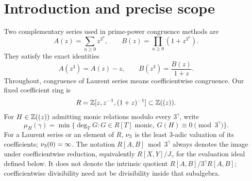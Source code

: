 \maketitle
\begin{abstract}
Let $A(z)=\sum_{n\ge0}z^{3^n}$ and
$B(z)=\prod_{n\ge0}(1+z^{3^n})$. We study their joint algebra modulo
powers of $3$ over $R=\Z[z,z^{-1},(1+z)^{-1}]$.
The individual minimum-degree problems of Krattenthaler and M\"uller
provide a starting point, but do not determine mixed relations.
We give exact joint evaluation kernels modulo $3,9,27,81$, with
respectively $6,18,36,48$ necessary and sufficient module generators.
For $H=A+B$, the minimum degree of a monic annihilator is exactly
$6\gamma$ for $1\le\gamma\le9$, and exactly $54$ for $\gamma=10$.
The lower bounds use two independent Artin--Schreier correction classes.
For every polynomial $F(A,B)$, a root-counting norm construction gives
an annihilator of degree at most $6d$, where
$d+\sum_{j\ge1}\lfloor d/9^j\rfloor\ge\gamma$.
This is $(16/3)\gamma+O(\log\gamma)$, improving the elementary $6\gamma$
bound. We also give an all-precision mixed spanning theorem, classify
the reduced mixed fields for every odd prime, and supply a direct
characteristic-zero independence proof. The full mixed kernel and the
optimal degree for $H$ beyond precision $3^{10}$ are left open.
\end{abstract}

\section{Introduction and precise scope}
\label{sec:intro}

Two complementary series used in prime-power congruence methods are
\begin{equation}\label{eq:AB}
 A(z)=\sum_{n\ge0}z^{3^n},\qquad
 B(z)=\prod_{n\ge0}(1+z^{3^n}).
\end{equation}
They satisfy the exact identities
\begin{equation}\label{eq:functional}
 A(z^3)=A(z)-z,\qquad B(z^3)=\frac{B(z)}{1+z}.
\end{equation}
Throughout, congruence of Laurent series means coefficientwise
congruence. Our fixed coefficient ring is
\[
 R=\mathbb Z[z,z^{-1},(1+z)^{-1}]\subset\mathbb Z((z)).
\]
For $H\in\mathbb Z((z))$ admitting monic relations modulo every $3^\gamma$, write
\begin{equation}\label{eq:mu}
 \mu_H(\gamma)=\min\{\deg_T G:G\in R[T]\text{ monic},\
                         G(H)\equiv0\pmod{3^\gamma}\}.
\end{equation}
For a Laurent series or an element of $R$, $\nu_3$ is the least $3$-adic
valuation of its coefficients; $\nu_3(0)=\infty$.
The notation $R[A,B]\bmod3^\gamma$ always denotes the image under
coefficientwise reduction, equivalently $R[X,Y]/J_\gamma$ for the
evaluation ideal defined below. It does not denote the intrinsic
quotient $R[A,B]/3^\gamma R[A,B]$; coefficientwise divisibility need
not be divisibility inside that subalgebra.

